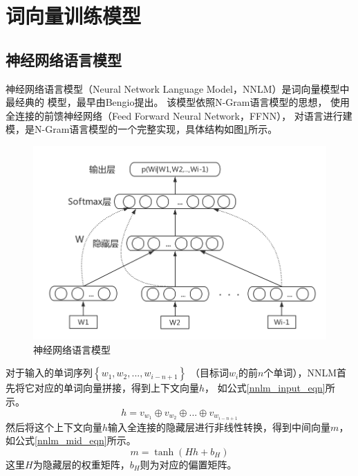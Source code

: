 \section{词向量训练模型}
\subsection{神经网络语言模型}
神经网络语言模型（Neural Network Language Model，NNLM）是词向量模型中最经典的
模型，最早由Bengio提出。
该模型依照N-Gram语言模型的思想，
使用全连接的前馈神经网络（Feed Forward Neural Network，FFNN），
对语言进行建模，是N-Gram语言模型的一个完整实现，具体结构如图\ref{nnlm}所示。
\begin{figure}[h]
    \includegraphics[scale=0.5]{picture/nnlm.png}
    \caption{神经网络语言模型}
    \label{nnlm}
\end{figure}

对于输入的单词序列$\left \{ w_{1},w_{2},...,w_{i-n+1} \right \}$
（目标词$w_i$的前$n$个单词），NNLM首先将它对应的单词向量拼接，得到上下文向量$h$，
如公式\ref{nnlm_input_eqn}所示。
\begin{equation}
    h = v_{w_1} \oplus v_{w_2} \oplus ... \oplus v_{w_{i-n+1}}
    \label{nnlm_input_eqn}
\end{equation}
然后将这个上下文向量$h$输入全连接的隐藏层进行非线性转换，得到中间向量$m$，
如公式\ref{nnlm_mid_eqn}所示。
\begin{equation}
    m = \tanh \left ( Hh+b_H \right )
    \label{nnlm_mid_eqn}
\end{equation}
这里$H$为隐藏层的权重矩阵，$b_H$则为对应的偏置矩阵。

